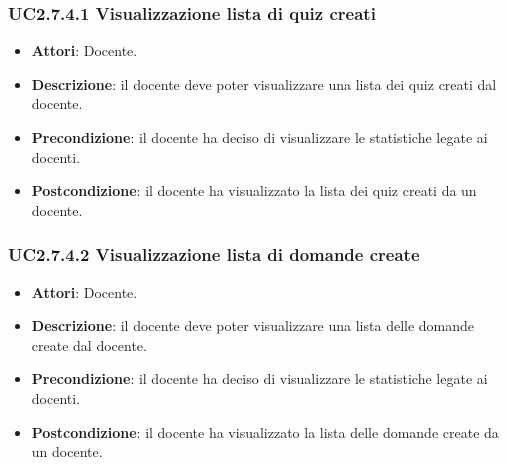 \subsubsection{UC2.7.4.1 Visualizzazione lista di quiz creati}
\begin{itemize}
\item \textbf{Attori}: Docente.
\item \textbf{Descrizione}: il docente deve poter visualizzare una lista dei quiz creati dal docente.
\item \textbf{Precondizione}: il docente ha deciso di visualizzare le statistiche legate ai docenti.
\item \textbf{Postcondizione}: il docente ha visualizzato la lista dei quiz creati da un docente.
\end{itemize}
\subsubsection{UC2.7.4.2 Visualizzazione lista di domande create}
\begin{itemize}
\item \textbf{Attori}: Docente.
\item \textbf{Descrizione}: il docente deve poter visualizzare una lista delle domande create dal docente.
\item \textbf{Precondizione}: il docente ha deciso di visualizzare le statistiche legate ai docenti.
\item \textbf{Postcondizione}: il docente ha visualizzato la lista delle domande create da un docente.
\end{itemize}
